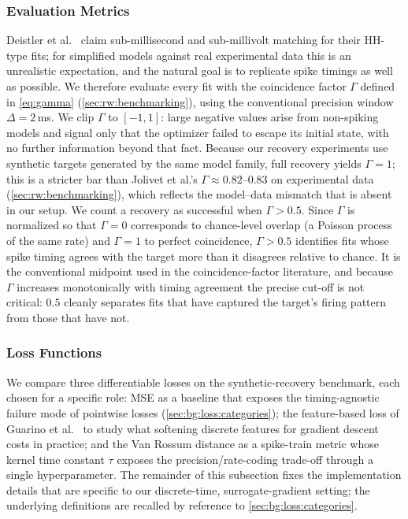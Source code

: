 \subsubsection{Evaluation Metrics}\label{sec:method:opt:evaluation-metrics}
Deistler et al.~\cite{Deistler2025} claim sub-millisecond and sub-millivolt matching for their \gls{HH}-type fits;
for simplified models against real experimental data this is an unrealistic expectation, and the natural goal is to replicate spike timings as well as possible.
We therefore evaluate every fit with the coincidence factor $\Gamma$ defined in \cref{eq:gamma} (\cref{sec:rw:benchmarking}), using the conventional precision window $\Delta = 2$\,ms.
We clip $\Gamma$ to $[-1, 1]$: large negative values arise from non-spiking models and signal only that the optimizer failed to escape its initial state, with no further information beyond that fact.
Because our recovery experiments use synthetic targets generated by the same model family, full recovery yields $\Gamma = 1$;
this is a stricter bar than Jolivet et al.'s $\Gamma \approx 0.82$--$0.83$ on experimental data (\cref{sec:rw:benchmarking}), which reflects the model--data mismatch that is absent in our setup.
We count a recovery as successful when $\Gamma > 0.5$.
Since $\Gamma$ is normalized so that $\Gamma = 0$ corresponds to chance-level overlap (a Poisson process of the same rate) and $\Gamma = 1$ to perfect coincidence, $\Gamma > 0.5$ identifies fits whose spike timing agrees with the target more than it disagrees relative to chance.
It is the conventional midpoint used in the coincidence-factor literature, and because $\Gamma$ increases monotonically with timing agreement the precise cut-off is not critical: $0.5$ cleanly separates fits that have captured the target's firing pattern from those that have not.

\subsubsection{Loss Functions}\label{sec:method:opt:loss}
We compare three differentiable losses on the synthetic-recovery benchmark, each chosen for a specific role:
\gls{MSE} as a baseline that exposes the timing-agnostic failure mode of pointwise losses (\cref{sec:bg:loss:categories});
the feature-based loss of Guarino et al.~\cite{Guarino2025} to study what softening discrete features for gradient descent costs in practice;
and the Van Rossum distance as a spike-train metric whose kernel time constant $\tau$ exposes the precision/rate-coding trade-off through a single hyperparameter.
The remainder of this subsection fixes the implementation details that are specific to our discrete-time, surrogate-gradient setting; the underlying definitions are recalled by reference to \cref{sec:bg:loss:categories}.

